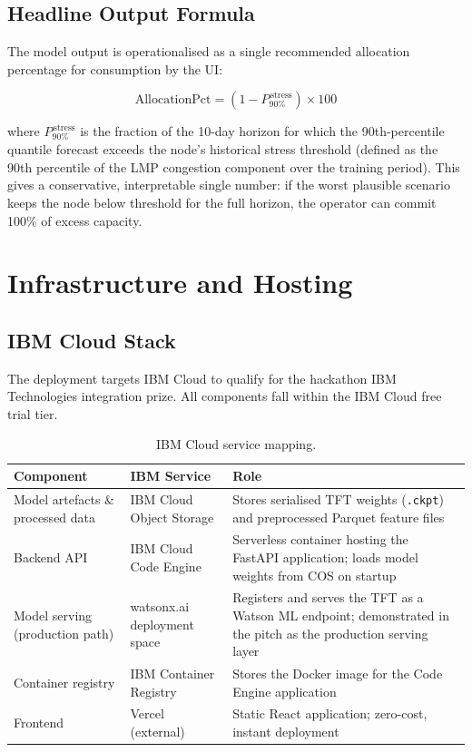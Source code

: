 \documentclass[10pt,letterpaper]{article}
\newcommand{\tft}{\textsc{TFT}\xspace}
\begin{document}
\subsection{Headline Output Formula}

The model output is operationalised as a single recommended allocation percentage
for consumption by the UI:

\[
  \text{AllocationPct} = \left(1 - P_{90\%}^{\,\text{stress}}\right) \times 100
\]

where $P_{90\%}^{\,\text{stress}}$ is the fraction of the 10-day horizon for which
the 90th-percentile quantile forecast exceeds the node's historical stress threshold
(defined as the 90th percentile of the LMP congestion component over the training
period). This gives a conservative, interpretable single number: if the worst plausible
scenario keeps the node below threshold for the full horizon, the operator can commit
100\% of excess capacity.

\section{Infrastructure and Hosting}

\subsection{IBM Cloud Stack}

The deployment targets IBM Cloud to qualify for the hackathon IBM Technologies
integration prize. All components fall within the IBM Cloud free trial tier.

\begin{table}[H]
\centering
\caption{IBM Cloud service mapping.}
\label{tab:ibm}
\renewcommand{\arraystretch}{1.25}
\begin{tabularx}{\linewidth}{@{}llX@{}}
\toprule
\textbf{Component} & \textbf{IBM Service} & \textbf{Role} \\
\midrule
Model artefacts \& processed data
  & IBM Cloud Object Storage
  & Stores serialised \tft weights (\texttt{.ckpt}) and
    preprocessed Parquet feature files \\
Backend API
  & IBM Cloud Code Engine
  & Serverless container hosting the FastAPI application;
    loads model weights from COS on startup \\
Model serving (production path)
  & watsonx.ai deployment space
  & Registers and serves the \tft as a Watson ML endpoint;
    demonstrated in the pitch as the production serving layer \\
Container registry
  & IBM Container Registry
  & Stores the Docker image for the Code Engine application \\
Frontend
  & Vercel (external)
  & Static React application; zero-cost, instant deployment \\
\bottomrule
\end{tabularx}
\end{table}
\end{document}
